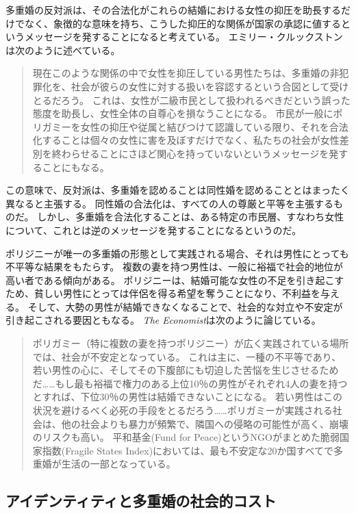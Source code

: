\documentclass[paper=a4,book,openany]{jlreq} \usepackage{mystyle}
\begin{document}
多重婚の反対派は、その合法化がこれらの結婚における女性の抑圧を助長するだけでなく、象徴的な意味を持ち、こうした抑圧的な関係が国家の承認に値するというメッセージを発することになると考えている。
エミリー・クルックストンは次のように述べている。

\begin{quote}
現在このような関係の中で女性を抑圧している男性たちは、多重婚の非犯罪化を、社会が彼らの女性に対する扱いを容認するという合図として受けとるだろう。
これは、女性が二級市民として扱われるべきだという誤った態度を助長し、女性全体の自尊心を損なうことになる。
市民が一般にポリガミーを女性の抑圧や従属と結びつけて認識している限り、それを合法化することは個々の女性に害を及ぼすだけでなく、私たちの社会が女性差別を終わらせることにさほど関心を持っていないというメッセージを発することにもなる。
\citep[p.272]{crookston15:_love_polyg_marriag}
\end{quote}

この意味で、反対派は、多重婚を認めることは同性婚を認めることとはまったく異なると主張する。
同性婚の合法化は、すべての人の尊厳と平等を主張するものだ。
しかし、多重婚を合法化することは、ある特定の市民層、すなわち女性について、これとは逆のメッセージを発することになるというのだ。

ポリジニーが唯一の多重婚の形態として実践される場合、それは男性にとっても不平等な結果をもたらす。
複数の妻を持つ男性は、一般に裕福で社会的地位が高い者である傾向がある。
ポリジニーは、結婚可能な女性の不足を引き起こすため、貧しい男性にとっては伴侶を得る希望を奪うことになり、不利益を与える。
そして、大勢の男性が結婚できなくなることで、社会的な対立や不安定が引き起こされる要因ともなる。
\emph{The Economist}は次のように論じている。

\begin{quote}
ポリガミー（特に複数の妻を持つポリジニー）が広く実践されている場所では、社会が不安定となっている。
これは主に、一種の不平等であり、若い男性の心に、そしてその下腹部にも切迫した苦悩を生じさせるためだ……もし最も裕福で権力のある上位10％の男性がそれぞれ4人の妻を持つとすれば、下位30％の男性は結婚できないことになる。
若い男性はこの状況を避けるべく必死の手段をとるだろう……ポリガミーが実践される社会は、他の社会よりも暴力が頻繁で、隣国への侵略の可能性が高く、崩壊のリスクも高い。
平和基金(Fund for Peace)というNGOがまとめた脆弱国家指数(Fragile States Index)においては、最も不安定な20か国すべてで多重婚が生活の一部となっている。
\citep{economist17:_link_between_polyg_war}
\end{quote}

\subsection{アイデンティティと多重婚の社会的コスト}
\end{document}
